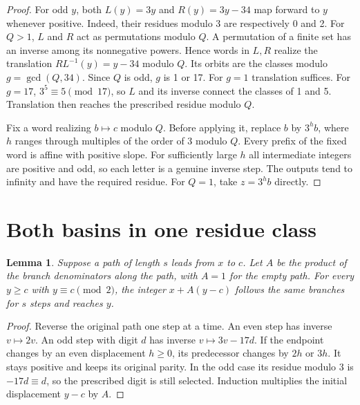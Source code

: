 \documentclass[11pt,a4paper]{article}
\newtheorem{lemma}[theorem]{Lemma}
\begin{document}
\begin{proof}
For odd $y$, both $L(y)=3y$ and $R(y)=3y-34$ map forward to $y$ whenever positive. Indeed, their residues modulo 3 are respectively 0 and 2. For $Q>1$, $L$ and $R$ act as permutations modulo $Q$. A permutation of a finite set has an inverse among its nonnegative powers. Hence words in $L,R$ realize the translation $RL^{-1}(y)=y-34$ modulo $Q$. Its orbits are the classes modulo $g=\gcd(Q,34)$. Since $Q$ is odd, $g$ is 1 or 17. For $g=1$ translation suffices. For $g=17$, $3^5\equiv5\pmod{17}$, so $L$ and its inverse connect the classes of 1 and 5. Translation then reaches the prescribed residue modulo $Q$.

Fix a word realizing $b\mapsto c$ modulo $Q$. Before applying it, replace $b$ by $3^h b$, where $h$ ranges through multiples of the order of 3 modulo $Q$. Every prefix of the fixed word is affine with positive slope. For sufficiently large $h$ all intermediate integers are positive and odd, so each letter is a genuine inverse step. The outputs tend to infinity and have the required residue. For $Q=1$, take $z=3^h b$ directly.
\end{proof}

\newpage
\section{Both basins in one residue class}
\begin{lemma}\label{lem:lift}
Suppose a path of length $s$ leads from $x$ to $c$. Let $A$ be the product of the branch denominators along the path, with $A=1$ for the empty path. For every $y\ge c$ with $y\equiv c\pmod2$, the integer $x+A(y-c)$ follows the same branches for $s$ steps and reaches $y$.
\end{lemma}
\begin{proof}
Reverse the original path one step at a time. An even step has inverse $v\mapsto2v$. An odd step with digit $d$ has inverse $v\mapsto3v-17d$. If the endpoint changes by an even displacement $h\ge0$, its predecessor changes by $2h$ or $3h$. It stays positive and keeps its original parity. In the odd case its residue modulo 3 is $-17d\equiv d$, so the prescribed digit is still selected. Induction multiplies the initial displacement $y-c$ by $A$.
\end{proof}
\end{document}
